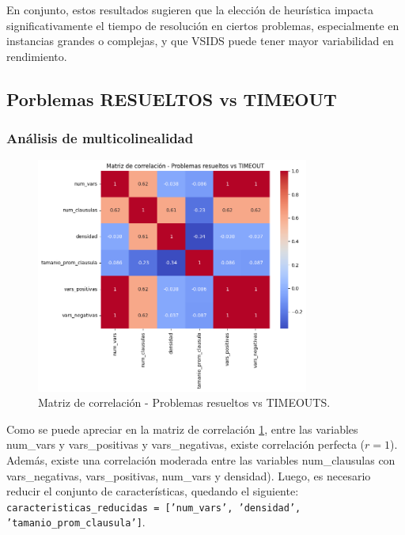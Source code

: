 En conjunto, estos resultados sugieren que la elección de heurística impacta significativamente el tiempo de resolución en ciertos problemas, especialmente en instancias grandes o complejas, y que VSIDS puede tener mayor variabilidad en rendimiento.

\subsection{Porblemas RESUELTOS vs TIMEOUT}

\subsubsection{An\'alisis de multicolinealidad}

\begin{figure}[ht]
    \centering
    \includegraphics[width=0.8\textwidth]{Graphics/correlation_matrix_solveds_vs_timeouts.png}
    \caption{Matriz de correlaci\'on - Problemas resueltos vs TIMEOUTS.}
    \label{fig:correlation-matrix-solved-vs-timeout}
\end{figure}

Como se puede apreciar en la matriz de correlaci\'on \ref{fig:correlation-matrix-solved-vs-timeout}, entre las variables num\_vars y vars\_positivas y vars\_negativas, existe correlaci\'on perfecta ($r=1$). Adem\'as, existe una correlaci\'on moderada entre las variables num\_clausulas con vars\_negativas, vars\_positivas, num\_vars y densidad). Luego, es necesario reducir el conjunto de caracter\'isticas, quedando  el siguiente: \texttt{caracteristicas\_reducidas = ['num\_vars', 'densidad', 'tamanio\_prom\_clausula']}.

